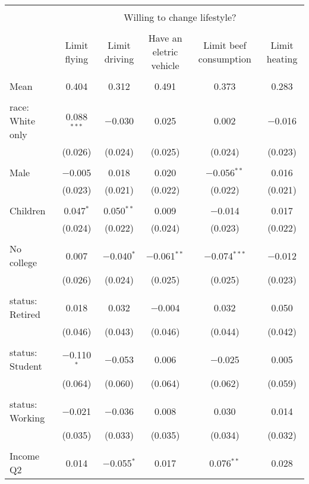 
\begin{tabular}{@{\extracolsep{5pt}}lccccc} 
\\[-1.8ex]\hline 
\hline \\[-1.8ex] 
 & \multicolumn{5}{c}{Willing to change lifestyle?} \\ 
\cline{2-6} 
\\[-1.8ex] & Limit flying & Limit driving & Have an eletric vehicle & Limit beef consumption & Limit heating \\ 
\hline \\[-1.8ex] 
 Mean & 0.404 & 0.312 & 0.491 & 0.373 & 0.283  \\ \hline \\[-1.8ex] race: White only & 0.088$^{***}$ & $-$0.030 & 0.025 & 0.002 & $-$0.016 \\ 
  & (0.026) & (0.024) & (0.025) & (0.024) & (0.023) \\ 
  & & & & & \\ 
 Male & $-$0.005 & 0.018 & 0.020 & $-$0.056$^{**}$ & 0.016 \\ 
  & (0.023) & (0.021) & (0.022) & (0.022) & (0.021) \\ 
  & & & & & \\ 
 Children & 0.047$^{*}$ & 0.050$^{**}$ & 0.009 & $-$0.014 & 0.017 \\ 
  & (0.024) & (0.022) & (0.024) & (0.023) & (0.022) \\ 
  & & & & & \\ 
 No college & 0.007 & $-$0.040$^{*}$ & $-$0.061$^{**}$ & $-$0.074$^{***}$ & $-$0.012 \\ 
  & (0.026) & (0.024) & (0.025) & (0.025) & (0.023) \\ 
  & & & & & \\ 
 status: Retired & 0.018 & 0.032 & $-$0.004 & 0.032 & 0.050 \\ 
  & (0.046) & (0.043) & (0.046) & (0.044) & (0.042) \\ 
  & & & & & \\ 
 status: Student & $-$0.110$^{*}$ & $-$0.053 & 0.006 & $-$0.025 & 0.005 \\ 
  & (0.064) & (0.060) & (0.064) & (0.062) & (0.059) \\ 
  & & & & & \\ 
 status: Working & $-$0.021 & $-$0.036 & 0.008 & 0.030 & 0.014 \\ 
  & (0.035) & (0.033) & (0.035) & (0.034) & (0.032) \\ 
  & & & & & \\ 
 Income Q2 & 0.014 & $-$0.055$^{*}$ & 0.017 & 0.076$^{**}$ & 0.028 \\ 

\end{tabular}
